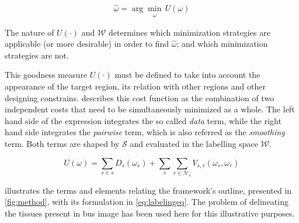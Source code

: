 \begin{equation}
\hat{\omega} = \arg \min_{\substack{\omega}} \,U(\omega)
\label{eq:costMin}
\end{equation}

The nature of $U(\cdot)$ and $\mathcal{W}$ determines which minimization strategies are applicable (or more desirable) in order to find $\hat{\omega}$; and which minimization strategies are not.

This goodness measure $U(\cdot)$ must be defined to take into account the appearance of the target region, its relation with other regions and other designing constrains.
 describes this cost function as the combination of two independent costs that need to be simultaneously minimized as a whole.
The left hand side of the expression integrates the so called \emph{data} term, while the right hand side integrates the \emph{pairwise} term, which is also referred as the \emph{smoothing} term.
Both terms are shaped by $\mathcal{S}$ and evaluated in the labelling space $\mathcal{W}$.

\begin{equation}
  U(\omega) = \sum_{s\in s} D_s(\omega_s) + \sum_{s}\sum_{r \in \mathcal{N}_{s}} V_{s,r}(\omega_s,\omega_r)
  \label{eq:labelingeq}
\end{equation}

 illustrates the terms and elements relating the framework's outline, presented in \cref{fig:method}, with its formulation in \cref{eq:labelingeq}.
The problem of delineating the tissues present in \ac{bus} image has been used here for this illustrative purposes. 


